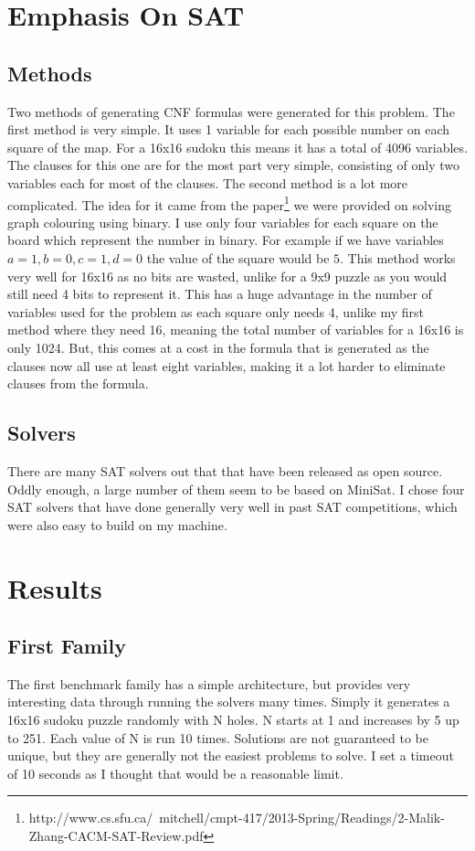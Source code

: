 \documentclass[11pt]{article} %
\begin{document}
\section{Emphasis On SAT}
\subsection{Methods}
Two methods of generating CNF formulas were generated for this problem. The first method is very simple. It uses 1 variable for each possible number on each square of the map. For a 16x16 sudoku this means it has a total of 4096 variables. The clauses for this one are for the most part very simple, consisting of only two variables each for most of the clauses. The second method is a lot more complicated. The idea for it came from the paper\footnote{http://www.cs.sfu.ca/~mitchell/cmpt-417/2013-Spring/Readings/2-Malik-Zhang-CACM-SAT-Review.pdf} we were provided on solving graph colouring using binary. I use only four variables for each square on the board which represent the number in binary. For example if we have variables $a = 1, b = 0, c = 1, d = 0$ the value of the square would be $5$. This method works very well for 16x16 as no bits are wasted, unlike for a 9x9 puzzle as you would still need 4 bits to represent it. This has a huge advantage in the number of variables used for the problem as each square only needs 4, unlike my first method where they need 16, meaning the total number of variables for a 16x16 is only 1024. But, this comes at a cost in the formula that is generated as the clauses now all use at least eight variables, making it a lot harder to eliminate clauses from the formula.
\subsection{Solvers}
There are many SAT solvers out that that have been released as open source. Oddly enough, a large number of them seem to be based on MiniSat. I chose four SAT solvers that have done generally very well in past SAT competitions, which were also easy to build on my machine.

\section{Results}
\subsection{First Family}
The first benchmark family has a simple architecture, but provides very interesting data through running the solvers many times. Simply it generates a 16x16 sudoku puzzle randomly with N holes. N starts at 1 and increases by 5 up to 251. Each value of N is run 10 times. Solutions are not guaranteed to be unique, but they are generally not the easiest problems to solve. I set a timeout of 10 seconds as I thought that would be a reasonable limit.
\end{document}
